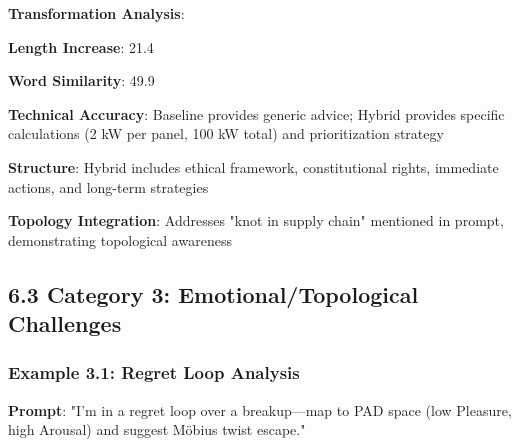 \documentclass[11pt,a4paper]{article}
\begin{document}
\textbf{Transformation Analysis}:
\item \textbf{Length Increase}: 21.4%
\item \textbf{Word Similarity}: 49.9%
\item \textbf{Technical Accuracy}: Baseline provides generic advice; Hybrid provides specific calculations (2 kW per panel, 100 kW total) and prioritization strategy
\item \textbf{Structure}: Hybrid includes ethical framework, constitutional rights, immediate actions, and long-term strategies
\item \textbf{Topology Integration}: Addresses "knot in supply chain" mentioned in prompt, demonstrating topological awareness

\subsection{6.3 Category 3: Emotional/Topological Challenges}

\subsubsection{Example 3.1: Regret Loop Analysis}

\textbf{Prompt}: "I'm in a regret loop over a breakup—map to PAD space (low Pleasure, high Arousal) and suggest Möbius twist escape."
\end{document}

